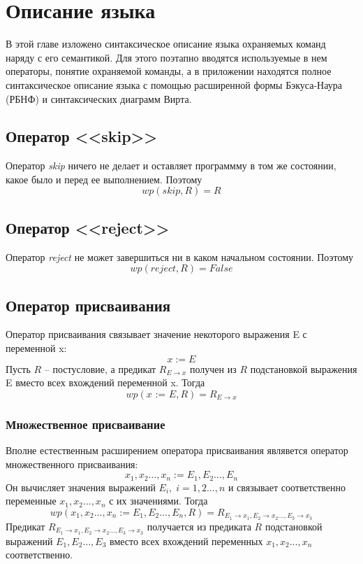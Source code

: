 \chapter{Описание языка} \label{ch2}
В этой главе изложено синтаксическое описание языка охраняемых команд наряду с его семантикой.
Для этого поэтапно вводятся используемые в нем операторы, понятие охраняемой команды, а в приложении
находятся полное синтаксическое описание языка с помощью расширенной формы Бэкуса-Наура (РБНФ) и 
синтаксических диаграмм Вирта.

\section{Оператор <<skip>>}
Оператор \textit{skip} ничего не делает и оставляет программму в том же состоянии, какое было и перед ее
выполнением. Поэтому 
\begin{equation}
	wp(\textit{skip}, R) = R
\end{equation}
\section{Оператор <<reject>>}
Оператор \textit{reject} не может завершиться ни в каком начальном состоянии. Поэтому
\begin{equation}
	wp(\textit{reject}, R) = False
\end{equation}
\section{Оператор присваивания}
Оператор присваивания связывает значение некоторого выражения E с переменной x:
\begin{equation}
	x := E
\end{equation}
Пусть $R$ -- постусловие, а предикат $R_{E\rightarrow x}$ получен из $R$ подстановкой выражения E вместо
всех вхождений переменной x. Тогда 
\begin{equation}
	wp(\textit{x := E}, R) = R_{E\rightarrow x}
\end{equation}
	\subsection{Множественное присваивание}
	Вполне естественным расширением оператора присваивания являвется оператор множественного присваивания:
\begin{equation}
	x_1, x_2 \ldots, x_n := E_1, E_2 \ldots, E_n
\end{equation}
	Он вычисляет значения выражений $E_i, \; i=1,2\ldots, n$ и связывает соответственно переменные $x_1, x_2 \ldots, x_n$ с
	их значениями. Тогда
	\begin{equation}
		wp(x_1, x_2 \ldots, x_n := E_1, E_2 \ldots, E_n, R) = R_{E_1\rightarrow x_1, E_2\rightarrow x_2 \ldots, E_3\rightarrow x_3} 
	\end{equation}
	Предикат $R_{E_1\rightarrow x_1, E_2\rightarrow x_2 \ldots, E_3\rightarrow x_3}$ получается из предиката $R$ подстановкой
	выражений $E_1, E_2 \ldots, E_3$ вместо всех вхождений переменных $x_1, x_2 \ldots, x_n$ соответственно.
